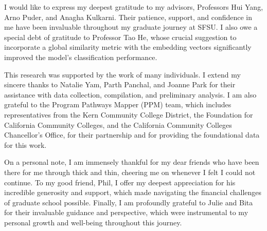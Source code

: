 \begin{acknowledgments}
I would like to express my deepest gratitude to my advisors, Professors Hui Yang, Arno Puder, and Anagha Kulkarni. Their patience, support, and confidence in me have been invaluable throughout my graduate journey at SFSU. I also owe a special debt of gratitude to Professor Tao He, whose crucial suggestion to incorporate a global similarity metric with the embedding vectors significantly improved the model's classification performance.

This research was supported by the work of many individuals. I extend my sincere thanks to Natalie Yam, Parth Panchal, and Joanne Park for their assistance with data collection, compilation, and preliminary analysis. I am also grateful to the Program Pathways Mapper (PPM) team, which includes representatives from the Kern Community College District, the Foundation for California Community Colleges, and the California Community Colleges Chancellor's Office, for their partnership and for providing the foundational data for this work.

On a personal note, I am immensely thankful for my dear friends who have been there for me through thick and thin, cheering me on whenever I felt I could not continue. To my good friend, Phil, I offer my deepest appreciation for his incredible generosity and support, which made navigating the financial challenges of graduate school possible. Finally, I am profoundly grateful to Julie and Bita for their invaluable guidance and perspective, which were instrumental to my personal growth and well-being throughout this journey.
\end{acknowledgments}